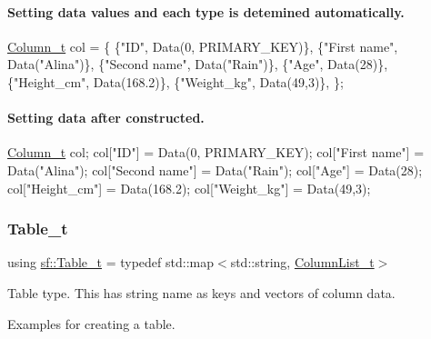\paragraph*{Setting data values and each type is detemined automatically.}


\begin{DoxyCode}
\hyperlink{namespacesf_a390d6a976138adf32ace872bbd298a30}{Column\_t} col = \{
    \{\textcolor{stringliteral}{"ID"}, Data(0, PRIMARY\_KEY)\},
    \{\textcolor{stringliteral}{"First name"}, Data(\textcolor{stringliteral}{"Alina"})\},
    \{\textcolor{stringliteral}{"Second name"}, Data(\textcolor{stringliteral}{"Rain"})\},
    \{\textcolor{stringliteral}{"Age"}, Data(28)\},
    \{\textcolor{stringliteral}{"Height\_cm"}, Data(168.2)\},
    \{\textcolor{stringliteral}{"Weight\_kg"}, Data(49,3)\},
\};
\end{DoxyCode}
 \paragraph*{Setting data after constructed.}


\begin{DoxyCode}
\hyperlink{namespacesf_a390d6a976138adf32ace872bbd298a30}{Column\_t} col;
col[\textcolor{stringliteral}{"ID"}] = Data(0, PRIMARY\_KEY);
col[\textcolor{stringliteral}{"First name"}] = Data(\textcolor{stringliteral}{"Alina"});
col[\textcolor{stringliteral}{"Second name"}] = Data(\textcolor{stringliteral}{"Rain"});
col[\textcolor{stringliteral}{"Age"}] = Data(28);
col[\textcolor{stringliteral}{"Height\_cm"}] = Data(168.2);
col[\textcolor{stringliteral}{"Weight\_kg"}] = Data(49,3);
\end{DoxyCode}
 \mbox{\label{namespacesf_a11fc7064fe56167aaff3e5fea85ac7a2}} 
\subsubsection{\texorpdfstring{Table\+\_\+t}{Table\_t}}
{\footnotesize\ttfamily using \hyperlink{namespacesf_a11fc7064fe56167aaff3e5fea85ac7a2}{sf\+::\+Table\+\_\+t} = typedef std\+::map$<$std\+::string, \hyperlink{namespacesf_a1307fc2d55d71a89cf1ac82655a9b1eb}{Column\+List\+\_\+t}$>$}



Table type. This has string name as keys and vectors of column data. 

Examples for creating a table.


